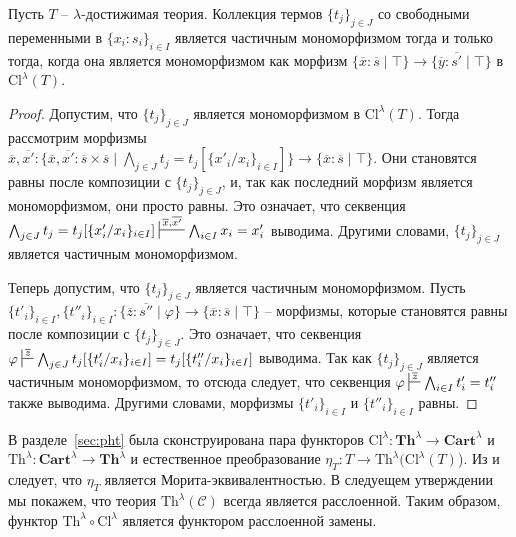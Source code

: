 \documentclass[reqno]{amsart}
\theoremstyle{definition}
\theoremstyle{remark}
\newcommand{\bcat}[1]{\mathbf{#1}}
\newcommand{\cat}[1]{\mathcal{#1}}
\newcommand{\fs}[1]{\mathrm{#1}}
\newcommand{\Th}{\bcat{Th}}
\begin{document}
\begin{lem}
Пусть $T$ -- $\lambda$-достижимая теория.
Коллекция термов $\{ t_j \}_{j \in J}$ со свободными переменными в $\{ x_i : s_i \}_{i \in I}$ является частичным мономорфизмом тогда и только тогда,
когда она является мономорфизмом как морфизм $\{ \overline{x} : \overline{s} \mid \top \} \to \{ \overline{y} : \overline{s'} \mid \top \}$ в $\fs{Cl}^\lambda(T)$.
\end{lem}
\begin{proof}
Допустим, что $\{ t_j \}_{j \in J}$ является мономорфизмом в $\fs{Cl}^\lambda(T)$.
Тогда рассмотрим морфизмы $\overline{x},\overline{x'} : \{ \overline{x}, \overline{x'} : \overline{s} \times \overline{s} \mid \bigwedge_{j \in J} t_j = t_j[\{ x'_i/x_i \}_{i \in I}] \} \to \{ \overline{x} : \overline{s} \mid \top \}$.
Они становятся равны после композиции с $\{ t_j \}_{j \in J}$, и, так как последний морфизм является мономорфизмом, они просто равны.
Это означает, что секвенция $\bigwedge_{j \in J} t_j = t_j[\{ x'_i/x_i \}_{i \in I}] \sststile{}{\overline{x},\overline{x'}} \bigwedge_{i \in I} x_i = x_i'$ выводима.
Другими словами, $\{ t_j \}_{j \in J}$ является частичным мономорфизмом.

Теперь допустим, что $\{ t_j \}_{j \in J}$ является частичным мономорфизмом.
Пусть $\{ t'_i \}_{i \in I}, \{ t''_i \}_{i \in I} : \{ \overline{z} : \overline{s''} \mid \varphi \} \to \{ \overline{x} : \overline{s} \mid \top \}$ -- морфизмы, которые становятся равны после композиции с $\{ t_j \}_{j \in J}$.
Это означает, что секвенция $\varphi \sststile{}{\overline{z}} \bigwedge_{j \in J} t_j[\{ t'_i/x_i \}_{i \in I}] = t_j[\{ t''_i/x_i \}_{i \in I}]$ выводима.
Так как $\{ t_j \}_{j \in J}$ является частичным мономорфизмом, то отсюда следует, что секвенция $\varphi \sststile{}{\overline{z}} \bigwedge_{i \in I} t'_i = t''_i$ также выводима.
Другими словами, морфизмы $\{ t'_i \}_{i \in I}$ и $\{ t''_i \}_{i \in I}$ равны.
\end{proof}

В разделе~\ref{sec:pht} была сконструирована пара функторов $\fs{Cl}^\lambda : \Th^\lambda \to \bcat{Cart}^\lambda$ и $\fs{Th}^\lambda : \bcat{Cart}^\lambda \to \Th^\lambda$ и естественное преобразование $\eta_T : T \to \fs{Th}^\lambda(\fs{Cl}^\lambda(T)$).
Из  и  следует, что $\eta_T$ является Морита-эквивалентностью.
В следуещем утверждении мы покажем, что теория $\fs{Th}^\lambda(\cat{C})$ всегда является расслоенной.
Таким образом, функтор $\fs{Th}^\lambda \circ \fs{Cl}^\lambda$ является функтором расслоенной замены.
\end{document}
